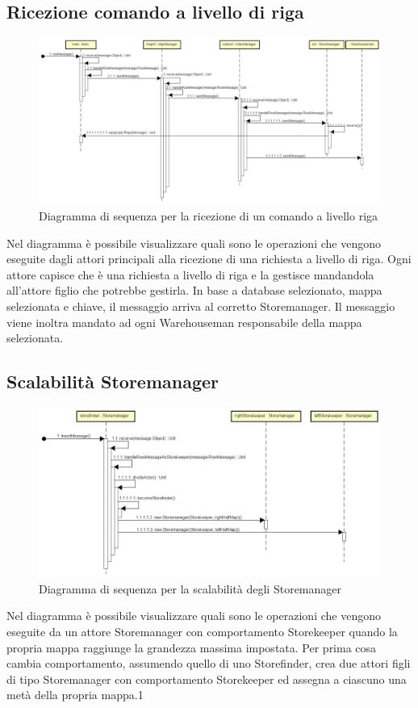 \documentclass[a4paper]{article}
\begin{document}
\subsection{Ricezione comando a livello di riga}
	\begin{figure}[H]
			\centering
			\includegraphics[width=\textwidth]{Sequenza/seqRowMessage.jpg}
			\caption{Diagramma di sequenza per la ricezione di un comando a livello riga}
		\end{figure}
		Nel diagramma è possibile visualizzare quali sono le operazioni che vengono eseguite dagli attori principali alla ricezione di una richiesta a livello di riga. Ogni attore capisce che è una richiesta a livello di riga e la gestisce mandandola all'attore figlio che potrebbe gestirla. In base a database selezionato, mappa selezionata e chiave, il messaggio arriva al corretto Storemanager. Il messaggio viene inoltra mandato ad ogni Warehouseman responsabile della mappa selezionata.
		
		\subsection{Scalabilità Storemanager}
	\begin{figure}[H]
			\centering
			\includegraphics[width=\textwidth]{Sequenza/seqDuplicazione.jpg}
			\caption{Diagramma di sequenza per la scalabilità degli Storemanager}
		\end{figure}
		Nel diagramma è possibile visualizzare quali sono le operazioni che vengono eseguite da un attore Storemanager con comportamento Storekeeper quando la propria mappa raggiunge la grandezza massima impostata. Per prima cosa cambia comportamento, assumendo quello di uno Storefinder, crea due attori figli di tipo Storemanager con comportamento Storekeeper ed assegna a ciascuno una metà della propria mappa.1
	
\end{document}
